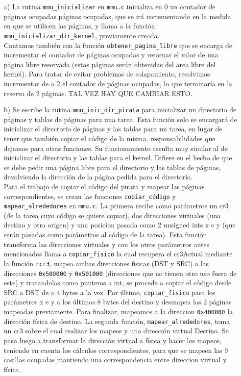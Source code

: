 \begin{enumerate}
\item[a)] La rutina {\tt mmu_inicializar} en {\tt mmu.c} inicializa en 0 un contador de páginas ocupadas p\'aginas ocupadas, que se ir\'a incrementando en la medida en que se utilicen las p\'aginas, y llama a la funci\'on {\tt mmu_inicializar_dir_kernel}, previamente creada.\\
Contamos también con la función {\tt obtener_pagina_libre} que se encarga de incrementar el contador de páginas ocupadas y retornar el valor de una página libre reservada (estas páginas serán obtenidas del area libre del kernel). Para tratar de evitar problemas de solapamiento, resolvimos incrementar de a 2 el contador de páginas ocupadas, lo que terminaría en la reserva de 2 páginas. TAL VEZ HAY QUE CAMBIAR ESTO.

\item[b)] Se escribe la rutina {\tt mmu_inic_dir_pirata} para inicializar un directorio de páginas y tablas de páginas para una tarea. Esta función solo se encargará de inicializar el directorio de páginas y las tablas para un tarea, en lugar de tener que también copiar el código de la misma, responsabilidades que dejamos para otras funciones. Su funcionamiento resulta muy similar al de inicializar el directorio y las tablas para el kernel. Difiere en el hecho de que se debe pedir una página libre para el directorio y las tablas de páginas, devolviendo la dirección de la página pedida para el directorio.\\

Para el trabajo de copiar el c\'odigo del pirata y mapear las p\'aginas correspondientes, se crean las funciones {\tt copiar\_código} y {\tt mapear\_alrededores} en {\tt mmu.c}. La primera recibe como parámetros un cr3 (de la tarea cuyo código se quiere copiar), dos direcciones virtuales (una destino y otra origen) y una posicion pasada como 2 unsigned ints x e y (que serán pasadas como parámetros al código de la tarea). Esta función transforma las direcciones virtuales y con los otros parámetros antes mencionados llama a {\tt copiar\_fisico} la cual recupera el cr3Actual mediante la función {\tt rcr3}, mapea ambas direcciones fisicas (DST y SRC) a las direcciones {\tt 0x500000} y {\tt 0x501000} (direcciones que no tienen otro uso fuera de este) y tratandolas como punteros a int, se procede a copiar el código desde SRC a DST de a 4 bytes a la vez. Por último, {\tt copiar\_fisico} pasa los parámetros x e y a los últimos 8 bytes del destino y desmapea las 2 páginas mapeadas previamente. Para finalizar, mapeamos a la direccion {\tt 0x400000} la dirección física de destino.
La segunda función, {\tt mapear\_alrededores}, toma un cr3 sobre el cual realizar los mapeos y una dirección virtual Destino. Se pasa luego a transformar la dirección virtual a física y hacer los mapeos, teniendo en cuenta los cálculos correspondientes, para que se mapeen las 9 casillas ocupadas mantiendo una correspondencia entre direccion virtual y física.


\end{enumerate}
